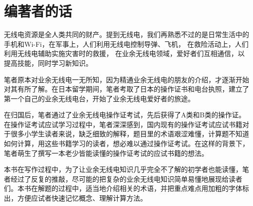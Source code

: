 \chapter*{编著者的话}

无线电资源是全人类共同的财产。提到无线电，我们再熟悉不过的是日常生活中的手机和Wi-Fi，在军事上，人们利用无线电控制导弹、飞机，%
在救险活动上，人们利用无线电辅助实施灾害时的救援，%
在业余无线电领域，爱好者们互相通信，以提高技能，同时学习新知识。

笔者原本对业余无线电一无所知，因为精通业余无线电的朋友的介绍，才逐渐开始对其有所了解。在日本留学期间，笔者考取了日本的操作证书和电台执照，建立了第一个自己的业余无线电台，开始了业余无线电爱好者的旅途。

在归国后，笔者通过了业余无线电操作证考试，先后获得了A类和B类的操作证。在操作证考试应试学习过程中，笔者深深感到，国内现有的操作证考试应试书籍对于很多小学生读者来说，缺乏细致的解释，题目里的术语艰涩难懂，计算题不知道如何计算，用这些书籍学习的读者，想必难以通过操作证考试。在这样的背景下，笔者萌生了撰写一本老少皆能读懂的操作证考试的应试书籍的想法。

本书在写作过程中，为了让业余无线电知识几乎完全不了解的初学者也能读懂，笔者经过了反复的推敲，尽可能的把复杂的业余无线电知识简单易懂地展现给读者们。本书在解题的过程中，适当地介绍相关的术语，并把重点难点用加粗的字体标出，方便应试者快速记忆概念、理解计算方法。



